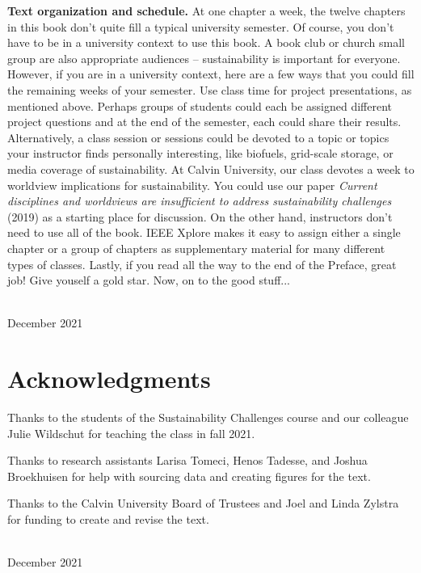 {\textbf{Text organization and schedule.} At one chapter a week, the twelve chapters
in this book don't quite fill a typical university semester. Of course, you don't
have to be in a university context to use this book. A book club or church small group 
are also appropriate audiences -- sustainability is important for everyone. However,
if you are in a university context, here are a few ways that you could fill the 
remaining weeks of your semester. Use class time for project presentations, as
mentioned above. Perhaps groups of students could each be assigned different 
project questions and at the end of the semester, each could share their results.
Alternatively, a class session or sessions could be devoted to a topic or topics your instructor
finds personally interesting, like biofuels, grid-scale storage, or media coverage
of sustainability. At Calvin University, our class devotes a week to worldview
implications for sustainability. You could use our paper \emph{Current disciplines 
and worldviews are insufficient to address sustainability challenges} (2019) as a 
starting place for discussion. %
On the other hand, instructors don't need to use all of the book. IEEE Xplore
makes it easy to assign either a single chapter or a group of chapters as supplementary
material for many different types of classes.
Lastly, if you read all the way to the end of the Preface, great job! Give youself a 
gold star. Now, on to the good stuff...


\vspace*{2pc}
\noindent\AUTHORS\\
\noindent December 2021
}

\clearpage




\blankpage

\chapter*{Acknowledgments}
\thispagestyle{plain}

\noindent
Thanks to the students of the Sustainability Challenges course and our colleague 
Julie Wildschut for teaching the class in fall 2021.

Thanks to research assistants Larisa Tomeci, Henos Tadesse, and Joshua Broekhuisen
for help with sourcing data and creating figures for the text. 

Thanks to the Calvin University Board of Trustees and Joel and Linda Zylstra
for funding to create and revise the text.

\vspace*{2pc}
\noindent\AUTHORS\\
\noindent December 2021
 
\clearpage

\blankpage

